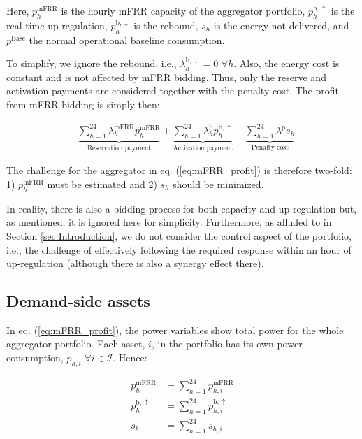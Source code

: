 \documentclass[lettersize,journal]{IEEEtran}
\begin{document}
Here, $p^{\text{mFRR}}_{h}$ is the hourly mFRR capacity of the aggregator portfolio, $p_{h}^{\text{b},\uparrow}$ is the real-time up-regulation, $p_{h}^{\text{b},\downarrow}$ is the rebound, $s_{h}$ is the energy not delivered, and $p^{\text{Base}}$ the normal operational baseline consumption.

To simplify, we ignore the rebound, i.e., $\lambda_{h}^{\text{b}, \downarrow} = 0$ $\forall{h}$. Also, the energy cost is constant and is not affected by mFRR bidding. Thus, only the reserve and activation payments are considered together with the penalty cost. The profit from mFRR bidding is simply then:

\begin{align}\label{eq:mFRR_profit}
     & \underbrace{\sum_{h=1}^{24}\lambda_{h}^{\text{mFRR}} p^{\text{mFRR}}_{h}}_{\textrm{Reservation payment}} + \underbrace{\sum_{h=1}^{24}  \lambda_{h}^{\text{b}} p^{\text{b},\uparrow}_{h}}_{\textrm{Activation payment}} - \underbrace{ \sum_{h=1}^{24}  \lambda^{\text{p}}s_{h}}_{\textrm{Penalty cost}}
\end{align}

The challenge for the aggregator in eq. (\ref{eq:mFRR_profit}) is therefore two-fold: 1) $p^{\text{mFRR}}_{h}$ must be estimated and 2) $s_{h}$ should be minimized.

In reality, there is also a bidding process for both capacity and up-regulation but, as mentioned, it is ignored here for simplicity. Furthermore, as alluded to in Section \ref{sec:Introduction}, we do not consider the control aspect of the portfolio, i.e., the challenge of effectively following the required response within an hour of up-regulation (although there is also a synergy effect there).

\subsection{Demand-side assets}

In eq. (\ref{eq:mFRR_profit}), the power variables show total power for the whole aggregator portfolio. Each asset, $i$, in the portfolio has its own power consumption, $p_{h, i}$ $\forall{i} \in \mathcal{I}$. Hence:

\begin{subequations}
    \begin{align}
        p^{\text{mFRR}}_{h}        & = \sum_{h=1}^{24} p^{\text{mFRR}}_{h, i}        \\
        p^{\text{b}, \uparrow}_{h} & = \sum_{h=1}^{24} p^{\text{b}, \uparrow}_{h, i} \\
        s_{h}                      & = \sum_{h=1}^{24} s_{h, i}
    \end{align}
\end{subequations}
\end{document}
